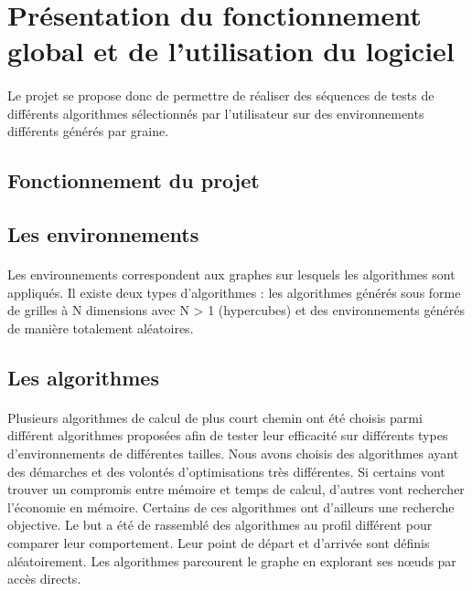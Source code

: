 \documentclass[pidr]{tnreport}
\begin{document}
	\section{Présentation du fonctionnement global et de l'utilisation du logiciel}

\paragraph{}
Le projet se propose donc de permettre de réaliser des séquences de tests de différents algorithmes sélectionnés par l'utilisateur sur des environnements différents générés par graine.

		\subsection{Fonctionnement du projet}
		
			\subsection{Les environnements}

\paragraph{}
Les environnements correspondent aux graphes sur lesquels les algorithmes sont appliqués. Il existe deux types d'algorithmes : les algorithmes générés sous forme de grilles à N dimensions avec N > 1 (hypercubes) et des environnements générés de manière totalement aléatoires.
			
			\subsection{Les algorithmes}
				
\paragraph{}
Plusieurs algorithmes de calcul de plus court chemin ont été choisis parmi différent algorithmes proposées afin de tester leur efficacité sur différents types d'environnements de différentes tailles. Nous avons choisis des algorithmes ayant des démarches et des volontés d'optimisations très différentes. Si certains vont trouver un compromis entre mémoire et temps de calcul, d'autres vont rechercher l'économie en mémoire. Certains de ces algorithmes ont d'ailleurs une recherche objective. Le but a été de rassemblé des algorithmes au profil différent pour comparer leur comportement. Leur point de départ et d'arrivée sont définis aléatoirement. Les algorithmes parcourent le graphe en explorant ses nœuds par accès directs.
		
\end{document}
